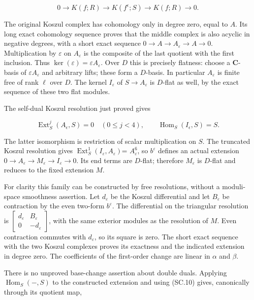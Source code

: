 \[
 0\longrightarrow K(f;R)\longrightarrow K(f^\epsilon;S)
       \longrightarrow K(f;R)\longrightarrow0.
 \tag{SC.9}
\]

The original Koszul complex has cohomology only in degree zero, equal
to \(A\). Its long exact cohomology sequence proves that the middle complex
is also acyclic in negative degrees, with a short exact sequence
\(0\to A\to A_\varepsilon\to A\to0\). Multiplication by \(\varepsilon\) on \(A_\varepsilon\) is the
composite of the last quotient with the first inclusion. Thus
\(\ker(\varepsilon)=\varepsilon A_\varepsilon\). Over \(D\) this is precisely flatness:
choose a \(\mathbf C\)-basis of \(\varepsilon A_\varepsilon\) and arbitrary lifts; these form
a \(D\)-basis. In particular \(A_\varepsilon\) is finite free of rank \(\ell\) over \(D\).
The kernel \(I_\varepsilon\) of \(S\to A_\varepsilon\) is \(D\)-flat as well, by the exact
sequence of these two flat modules.

The self-dual Koszul resolution just proved gives

\[
 \operatorname{Ext}^j_S(A_\epsilon,S)=0\quad(0\le j<4),
 \qquad
 \operatorname{Hom}_S(I_\epsilon,S)=S.
 \tag{SC.10}
\]

The latter isomorphism is restriction of scalar multiplication on \(S\).
The truncated Koszul resolution gives \(\operatorname{Ext}^1_S(I_\varepsilon,A_\varepsilon)\)=
\(A_\varepsilon^6\), so \(b^\varepsilon\) defines an actual extension
\(0\to A_\varepsilon\to M_\varepsilon\to I_\varepsilon\to0\). Its end terms are \(D\)-flat;
therefore \(M_\varepsilon\) is \(D\)-flat and reduces to the fixed extension \(M\).

For clarity this family can be constructed by free resolutions, without
a moduli-space smoothness assertion. Let \(d_\varepsilon\) be the Koszul
differential and let \(B_\varepsilon\) be contraction by the even two-form
\(b^\varepsilon\). The differential on the triangular resolution is
\(\left[\begin{smallmatrix}d_\varepsilon&B_\varepsilon\\0&-d_\varepsilon\end{smallmatrix}\right]\), with the same exterior modules
as the resolution of \(M\). Even contraction commutes with \(d_\varepsilon\),
so its square is zero. The short exact sequence with the two Koszul
complexes proves its exactness and the indicated extension in degree zero.
The coefficients of the first-order change are linear in \(\alpha\) and \(\beta\).

There is no unproved base-change assertion about double duals. Applying
\(\operatorname{Hom}_S(-,S)\) to the constructed extension and using (SC.10) gives,
canonically through its quotient map,

